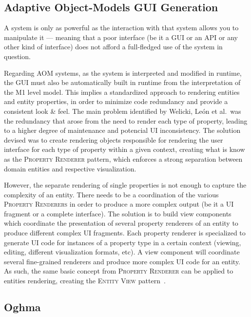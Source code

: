 \subsection{Adaptive Object-Models GUI Generation}\label{sec:aom_gui_generation}

A system is only as powerful as the interaction with that system allows you to manipulate it --- meaning that a poor interface (be it a GUI or an API or any other kind of interface) does not afford a full-fledged use of the system in question.

Regarding AOM systems, as the system is interpreted and modified in runtime, the GUI must also be automatically built in runtime from the interpretation of the M1 level model. This implies a standardized approach to rendering entities and entity properties, in order to minimize code redundancy and provide a consistent look \& feel. The main problem identified by Welicki, León et al.\ was the redundancy that arose from the need to render each type of property, leading to a higher degree of maintenance and potencial UI inconsistency. The solution devised was to create rendering objects responsible for rendering the user interface for each type of property within a given context, creating what is know as the \textsc{Property Renderer} pattern, which enforces a strong separation between domain entities and respective visualization.

However, the separate rendering of single properties is not enough to capture the complexity of an entity. There needs to be a coordination of the various \textsc{Property Renderers} in order to produce a more complex output (be it a UI fragment or a complete interface). The solution is to build view components which coordinate the presentation of several property renderers of an entity to produce different complex UI fragments. Each property renderer is specialized to generate UI code for instances of a property type in a certain context (viewing, editing, different visualization formats, etc). A view component will coordinate several fine-grained renderers and produce more complex UI code for an entity. As such, the same basic concept from \textsc{Property Renderer} can be applied to entities rendering, creating the \textsc{Entity View} pattern~\cite{WYW07}. %

\subsection{Oghma}\label{sec:oghma}

